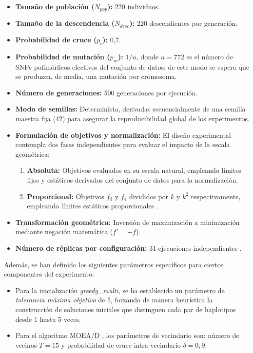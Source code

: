 \begin{itemize}
    \item \textbf{Tamaño de población ($N_{pop}$):} 220 individuos.
    \item \textbf{Tamaño de la descendencia ($N_{desc}$):} 220 descendientes por generación.
    \item \textbf{Probabilidad de cruce ($p_c$):} 0,7.
    \item \textbf{Probabilidad de mutación ($p_m$):} $1/n$, donde $n = 772$ es el número de SNPs polimórficos efectivos del conjunto de datos; de este modo se espera que se produzca, de media, una mutación por cromosoma.
    \item \textbf{Número de generaciones:} 500 generaciones por ejecución.
    \item \textbf{Modo de semillas:} Determinista, derivadas secuencialmente de una semilla maestra fija (42) para asegurar la reproducibilidad global de los experimentos.
    \item \textbf{Formulación de objetivos y normalización:} El diseño experimental contempla dos fases independientes para evaluar el impacto de la escala geométrica:
    \begin{enumerate}
        \item \textbf{Absoluta:} Objetivos evaluados en su escala natural, empleando límites fijos y estáticos derivados  del conjunto de datos para la normalización.
        \item \textbf{Proporcional:} Objetivos $f_3$ y $f_4$ divididos por $k$ y $k^2$ respectivamente, empleando límites estáticos proporcionales \cite{ting2010multi}.
    \end{enumerate}
    \item \textbf{Transformación geométrica:} Inversión de maximización a minimización mediante negación matemática ($f' = -f$).
    \item \textbf{Número de réplicas por configuración:} 31 ejecuciones independientes \cite{granado2020multiobjective}.
\end{itemize}

Además, se han definido los siguientes parámetros específicos para ciertos componentes del experimento:
\begin{itemize}
    \item Para la inicialización \textit{greedy\_multi}, se ha establecido un parámetro de \textit{tolerancia máxima objetivo} de 5, forzando de manera heurística la construcción de soluciones iniciales que distinguen cada par de haplotipos desde 1 hasta 5 veces.
    \item Para el algoritmo MOEA/D \cite{zhang2007moea}, los parámetros de vecindario son: número de vecinos $T = 15$ y probabilidad de cruce intra-vecindario $\delta = 0{,}9$.
\end{itemize}

